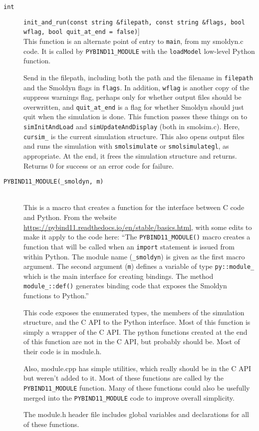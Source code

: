 \documentclass {scrbook}
\newcommand {\ttt} {\texttt}
\begin{document}
\begin{description}

\item[\ttt{int}]
\ttt{init\_and\_run(const string \&filepath, const string \&flags, bool wflag, bool quit\_at\_end = false)}]
\hfill \\
This function is an alternate point of entry to \ttt{main}, from my smoldyn.c code. It is called by \ttt{PYBIND11\_MODULE} with the \ttt{loadModel} low-level Python function.

Send in the filepath, including both the path and the filename in \ttt{filepath} and the Smoldyn flags in \ttt{flags}. In addition, \ttt{wflag} is another copy of the suppress warnings flag, perhaps only for whether output files should be overwritten, and \ttt{quit\_at\_end} is a flag for whether Smoldyn should just quit when the simulation is done. This function passes these things on to \ttt{simInitAndLoad} and \ttt{simUpdateAndDisplay} (both in smolsim.c). Here, \ttt{cursim\_} is the current simulation structure. This also opens output files and runs the simulation with \ttt{smolsimulate} or \ttt{smolsimulategl}, as appropriate. At the end, it frees the simulation structure and returns. Returns 0 for success or an error code for failure.

\item[\ttt{PYBIND11\_MODULE(\_smoldyn, m)}]
\hfill \\
This is a macro that creates a function for the interface between C code and Python. From the website \url{https://pybind11.readthedocs.io/en/stable/basics.html}, with some edits to make it apply to the code here: ``The \ttt{PYBIND11\_MODULE()} macro creates a function that will be called when an \ttt{import} statement is issued from within Python. The module name (\ttt{\_smoldyn}) is given as the first macro argument. The second argument (\ttt{m}) defines a variable of type \ttt{py::module\_} which is the main interface for creating bindings. The method \ttt{module\_::def()} generates binding code that exposes the Smoldyn functions to Python.''

This code exposes the enumerated types, the members of the simulation
structure, and the C API to the Python interface. Most of this function is
simply a wrapper of the C API. The python functions created at the end of this
function are not in the C API, but probably should be. Most of their code is in
module.h.

Also, module.cpp has simple utilities, which really should be in the C API but weren't added to it. Most of these functions are called by the \ttt{PYBIND11\_MODULE} function. Many of these functions could also be usefully merged into the \ttt{PYBIND11\_MODULE} code to improve overall simplicity.

The module.h header file includes global variables and declarations for all of these functions. 

\end{description}
\end{document}
